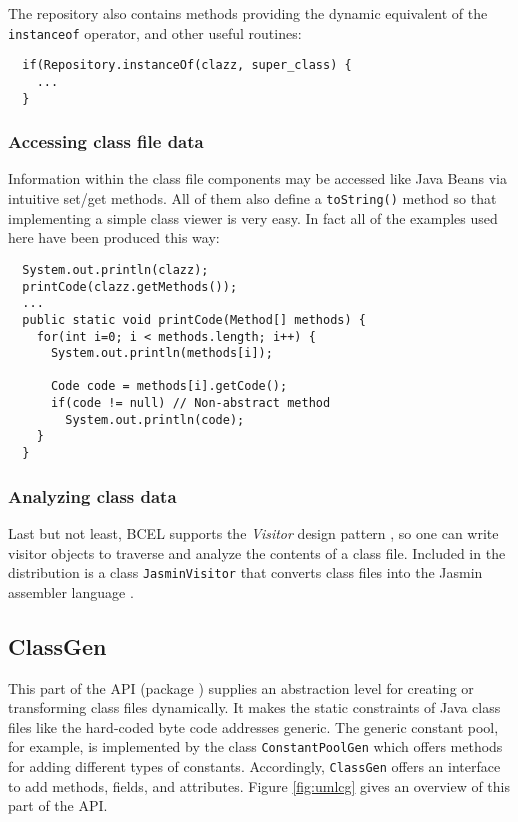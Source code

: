 \documentclass[12pt,twoside]{article}
\newcommand\jc{{\sffamily BCEL }}
\newcommand\cpe{constant pool}
\begin{document}
The repository also contains methods providing the dynamic equivalent
of the \texttt{instanceof} operator, and other useful routines:

\begin{verbatim}
  if(Repository.instanceOf(clazz, super_class) {
    ...
  }
\end{verbatim}

\subsubsection{Accessing class file data}

Information within the class file components may be accessed like Java
Beans via intuitive set/get methods.  All of them also define a
\texttt{toString()} method so that implementing a simple class viewer
is very easy. In fact all of the examples used here have been produced
this way:

{\small \begin{verbatim}
  System.out.println(clazz);
  printCode(clazz.getMethods());
  ...
  public static void printCode(Method[] methods) {
    for(int i=0; i < methods.length; i++) {
      System.out.println(methods[i]);

      Code code = methods[i].getCode();
      if(code != null) // Non-abstract method
        System.out.println(code);
    }
  }
\end{verbatim}}

\subsubsection{Analyzing class data}

Last but not least, \jc supports the \emph{Visitor} design
pattern \cite{design},  so one can write visitor  objects to traverse
and analyze the contents of a class file. Included in the distribution
is a  class \texttt{JasminVisitor} that converts class  files into the
Jasmin assembler language \cite{jasmin}.

\subsection{ClassGen}\label{sec:cgapi}

This part of the API (package ) supplies
an abstraction level for creating or transforming class files
dynamically.  It makes the static constraints of Java class files like
the hard-coded byte code addresses generic.  The generic \cpe, for
example, is implemented by the class \texttt{ConstantPoolGen} which
offers methods for adding different types of constants.  Accordingly,
\texttt{ClassGen} offers an interface to add methods, fields, and
attributes.  Figure \ref{fig:umlcg} gives an overview of this part of
the API.
\end{document}
